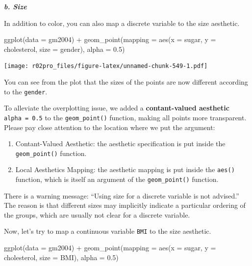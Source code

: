 \documentclass[
]{book}
\newenvironment{Shaded}{\begin{snugshade}}{\end{snugshade}}
\newcommand{\AttributeTok}[1]{\textcolor[rgb]{0.77,0.63,0.00}{#1}}
\newcommand{\FloatTok}[1]{\textcolor[rgb]{0.00,0.00,0.81}{#1}}
\newcommand{\FunctionTok}[1]{\textcolor[rgb]{0.00,0.00,0.00}{#1}}
\newcommand{\NormalTok}[1]{#1}
\newcommand{\SpecialCharTok}[1]{\textcolor[rgb]{0.00,0.00,0.00}{#1}}
\providecommand{\tightlist}{%
  \setlength{\itemsep}{0pt}\setlength{\parskip}{0pt}}
\begin{document}
\textbf{\emph{b. Size}}

In addition to color, you can also map a discrete variable to the size aesthetic.

\begin{Shaded}
\begin{Highlighting}[]
\FunctionTok{ggplot}\NormalTok{(}\AttributeTok{data =}\NormalTok{ gm2004) }\SpecialCharTok{+} 
  \FunctionTok{geom\_point}\NormalTok{(}\AttributeTok{mapping =} \FunctionTok{aes}\NormalTok{(}\AttributeTok{x =}\NormalTok{ sugar, }
                           \AttributeTok{y =}\NormalTok{ cholesterol,}
                           \AttributeTok{size =}\NormalTok{ gender),}
             \AttributeTok{alpha =} \FloatTok{0.5}\NormalTok{)}
\end{Highlighting}
\end{Shaded}

\texttt{[image: r02pro\_files/figure-latex/unnamed-chunk-549-1.pdf]}

You can see from the plot that the sizes of the points are now different according to the \texttt{gender}.

To alleviate the overplotting issue, we added a \textbf{contant-valued aesthetic} \texttt{alpha\ =\ 0.5} to the \texttt{geom\_point()} function, making all points more transparent. Please pay close attention to the location where we put the argument:

\begin{enumerate}
\def\labelenumi{\arabic{enumi}.}
\tightlist
\item
  Contant-Valued Aesthetic: the aesthetic specification is put inside the \texttt{geom\_point()} function.
\item
  Local Aesthetics Mapping: the aesthetic mapping is put inside the \texttt{aes()} function, which is itself an argument of the \texttt{geom\_point()} function.
\end{enumerate}

There is a warning message: ``Using size for a discrete variable is not advised.'' The reason is that different sizes may implicitly indicate a particular ordering of the groups, which are usually not clear for a discrete variable.

Now, let's try to map a continuous variable \texttt{BMI} to the size aesthetic.

\begin{Shaded}
\begin{Highlighting}[]
\FunctionTok{ggplot}\NormalTok{(}\AttributeTok{data =}\NormalTok{ gm2004) }\SpecialCharTok{+} 
  \FunctionTok{geom\_point}\NormalTok{(}\AttributeTok{mapping =} \FunctionTok{aes}\NormalTok{(}\AttributeTok{x =}\NormalTok{ sugar, }
                           \AttributeTok{y =}\NormalTok{ cholesterol,}
                           \AttributeTok{size =}\NormalTok{ BMI),}
             \AttributeTok{alpha =} \FloatTok{0.5}\NormalTok{)}
\end{Highlighting}
\end{Shaded}
\end{document}
